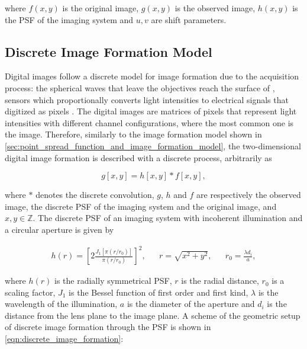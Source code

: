 \noindent where $f(x,y)$ is the original image, $g(x,y)$ is the observed image, $h(x,y)$ is the PSF of the imaging system and $u,v$ are shift parameters.

\subsection{Discrete Image Formation Model}

Digital images follow a discrete model for image formation due to the acquisition process: the spherical waves that leave the objectives reach the surface of , sensors which proportionally converts light intensities to electrical signals that digitized as pixels \cite{gonzalez2018digital}. The digital images are matrices of pixels that represent light intensities with different channel configurations, where the most common one is the  image. Therefore, similarly to the image formation model shown in \autoref{sec:point_spread_function_and_image_formation_model}, the two-dimensional digital image formation is described with a discrete process, arbitrarily as

\begin{equation}
\label{eqn:discrete_image_formation}
g[x,y] = h[x,y] \ast f[x,y],
\end{equation}

\noindent where $\ast$ denotes the discrete convolution, $g$, $h$ and $f$ are respectively the observed image, the discrete PSF of the imaging system and the original image, and $x,y \in \mathbb{Z}$. The discrete PSF of an imaging system with incoherent illumination and a circular aperture is given by

\begin{align}
\label{eqn:discrete_psf}
h(r) = \left[
        2
        \frac{J_{1}[\pi (r / r_{0})]}{\pi (r / r_{0})}
       \right]^{2},
&&
r = \sqrt{x^{2} + y^{2}},
&&
r_{0} = \frac{\lambda d_{i}}{a},
\end{align}

\noindent where $h(r)$ is the radially symmetrical PSF, $r$ is the radial distance, $r_{0}$ is a scaling factor, $J_{1}$ is the Bessel function of first order and first kind, $\lambda$ is the wavelength of the illumination, $a$ is the diameter of the aperture and $d_{i}$ is the distance from the lens plane to the image plane. A scheme of the geometric setup of discrete image formation through the PSF is shown in \autoref{eqn:discrete_image_formation}: 

